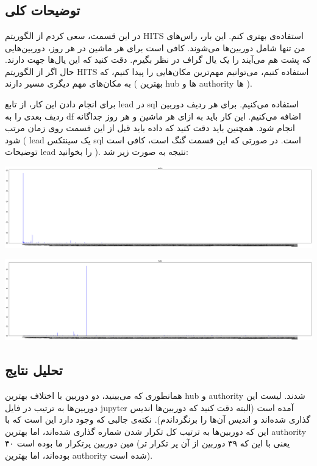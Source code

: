 \section{}

\subsection{توضیحات کلی}
در این قسمت، سعی کردم از الگوریتم 
HITS
استفاده‌ی بهتری کنم. این بار، راس‌های من تنها شامل دوربین‌ها می‌شوند. کافی است برای هر ماشین 
در هر روز، دوربین‌هایی که پشت هم می‌آیند را یک یال گراف در نظر بگیرم. دقت کنید 
که این یال‌ها جهت دارند. حال اگر از الگوریتم
HITS
استفاده کنیم،‌ می‌توانیم مهم‌ترین مکان‌هایی را پیدا کنیم، که به مکان‌های مهم دیگری مسیر دارند (
    بهترین 
    hub
    ها و 
    authority
    ها
). 

برای انجام دادن این کار، از تابع
lead
در 
sql
استفاده می‌کنیم. برای هر ردیف دوربین‌ ردیف بعدی را به 
df
اضافه می‌کنیم. این کار باید به ازای هر ماشین و هر روز جداگانه انجام شود. 
همچنین باید دقت کنید که داده باید قبل از این قسمت روی زمان مرتب شود (
    lead
    یک سینتکس 
    sql
    است. در صورتی که این قسمت گنگ است، کافی است توضیحات 
    lead
    را بخوانید
). 
نتیجه به صورت زیر شد: 

\includegraphics[scale = 0.2]{images/ImportantCameras/1.png}

\includegraphics[scale = 0.2]{images/ImportantCameras/2.png}


\subsection{تحلیل نتایج}

همانطوری که می‌بینید، دو دوربین با اختلاف بهترین
hub
و
authority
شدند. لیست این دوربین‌ها به ترتیب در فایل 
jupyter
آمده است (البته دقت کنید که دوربین‌ها اندیس گذاری شده‌اند و اندیس‌ آن‌ها را برنگرداندم). 
نکته‌ی جالبی که وجود دارد این است که با این که دوربین‌ها به ترتیب کل تکرار شدن 
شماره گذاری شده‌اند، اما بهترین 
authority
۴۰ 
مین دوربین پرتکرار ما بوده است (یعنی با این که ۳۹ دوربین از آن پر تکرار تر بوده‌اند، اما بهترین 
authority 
شده است). 
